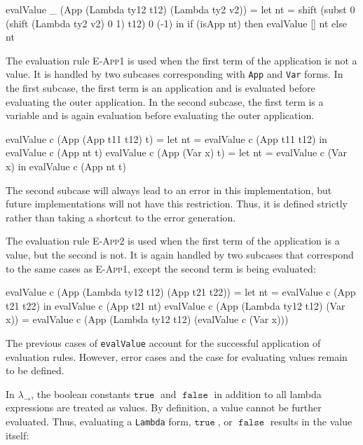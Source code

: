 \documentclass[10pt]{article}
\newcommand{\TRUE}{\ensuremath{\mathtt{ true \;}}}
\newcommand{\FALSE}{\ensuremath{\mathtt{\; false \;}}}
\begin{document}
\begin{code}
  evalValue _ (App (Lambda ty12 t12) (Lambda ty2 v2)) =
        let nt = shift (subst 0 (shift (Lambda ty2 v2) 0 1) t12) 0 (-1) in
            if (isApp nt) then evalValue [] nt else nt
\end{code}

The evaluation rule \textsc{E-App1} is used when the first term of the
application is not a value.  It is handled by two subcases
corresponding with \texttt{App} and \texttt{Var} forms.  In the first
subcase, the first term is an application and is evaluated before
evaluating the outer application.  In the second subcase, the first
term is a variable and is again evaluation before evaluating the outer
application.

\begin{code}
  evalValue c (App (App t11 t12) t) =
      let nt = evalValue c (App t11 t12) in evalValue c (App nt t)
  evalValue c (App (Var x) t) = 
      let nt = evalValue c (Var x) in evalValue c (App nt t)
\end{code}

The second subcase will always lead to an error in this
implementation, but future implementations will not have this
restriction.  Thus, it is defined strictly rather than taking a
shortcut to the error generation.

The evaluation rule \textsc{E-App2} is used when the first term of the
application is a value, but the second is not.  It is again handled by
two subcases that correspond to the same cases as \textsc{E-App1},
except the second term is being evaluated:

\begin{code}
  evalValue c (App (Lambda ty12 t12) (App t21 t22)) =
      let nt = evalValue c (App t21 t22) in evalValue c (App t21 nt)
  evalValue c (App (Lambda ty12 t12) (Var x)) = 
      evalValue c (App (Lambda ty12 t12) (evalValue c (Var x)))
\end{code}

The previous cases of \texttt{evalValue} account for the successful
application of evaluation rules.  However, error cases and the case
for evaluating values remain to be defined.

In $\lambda_\rightarrow$, the boolean constants $\TRUE$ and $\FALSE$ in
addition to all lambda expressions are treated as values.  By
definition, a value cannot be further evaluated.  Thus, evaluating a
\texttt{Lambda} form, $\TRUE$, or $\FALSE$ results in the value itself:
\end{document}
